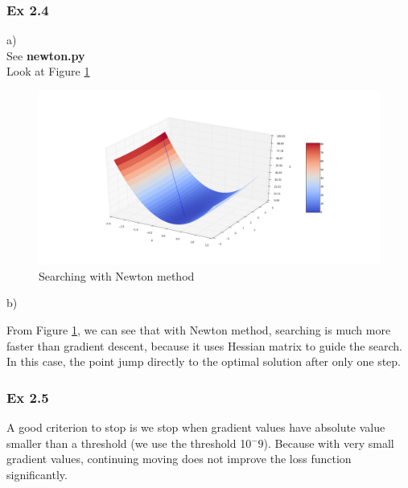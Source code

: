 \documentclass{article}
\begin{document}
\newpage

\subsubsection*{Ex 2.4}
a)\\
See \textbf{newton.py}\\
Look at Figure \ref{fig4}
\begin{figure}[h]
	\centering
	\includegraphics[scale=0.3]{newton.png}
	\caption{Searching with Newton method}
	\label{fig4}
\end{figure}

b)

From Figure \ref{fig4}, we can see that with Newton method, searching is much more faster than gradient descent, because it uses Hessian matrix to guide the search. In this case, the point jump directly to the optimal solution after only one step.

\subsubsection*{Ex 2.5}
A good criterion to stop is we stop when gradient values have absolute value smaller than a threshold (we use the threshold 10$^-9$). Because with very small gradient values, continuing moving does not improve the loss function significantly.
\end{document}
